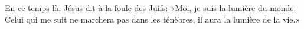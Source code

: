 En ce temps-là, Jésus dit à la foule des Juifs:
	«Moi, je suis la lumière du monde.
Celui qui me suit ne marchera pas dans les ténèbres,
	il aura la lumière de la vie.»
